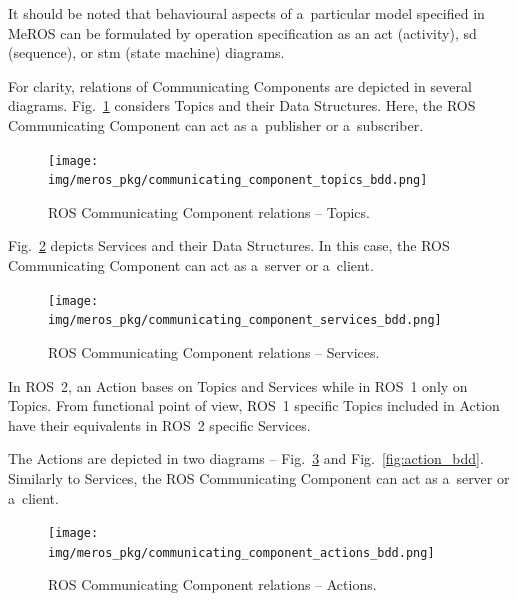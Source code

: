 \documentclass[11pt,oneside,a4paper]{report}
\begin{document}
	It should be noted that behavioural aspects of a~particular model specified in MeROS can be formulated by operation specification as an act (activity), sd (sequence), or stm (state machine) diagrams. 
	
	
	For clarity, relations of Communicating Components are depicted in several diagrams. Fig.~\ref{fig:communicating_component_topics_bdd} considers Topics and their Data Structures. Here, the ROS Communicating Component can act as a~publisher or a~subscriber.	
	 
	
	\begin{figure}[H]
		\centering
		\begin{center}
			{\texttt{[image: img/meros\_pkg/communicating\_component\_topics\_bdd.png]}}
		\end{center}
		\caption{ROS Communicating Component relations -- Topics.} 
		\label{fig:communicating_component_topics_bdd}
	\end{figure}
	
	\pagebreak
	
	Fig.~\ref{fig:communication_blocks_services_bdd} depicts Services and their Data Structures. In this case, the ROS Communicating Component can act as a~server or a~client.	
	
		
	\begin{figure}[H]
		\centering
		\begin{center}
			{\texttt{[image: img/meros\_pkg/communicating\_component\_services\_bdd.png]}}
		\end{center}
		\caption{ROS Communicating Component relations -- Services.} 
		\label{fig:communication_blocks_services_bdd}
	\end{figure}
	
	In ROS~2, an Action bases on Topics and Services while in ROS~1 only on Topics. From functional point of view, ROS~1 specific Topics included in Action have their equivalents in ROS~2 specific Services. 
	
	
	The Actions are depicted in two diagrams -- Fig.~\ref{fig:communicating_component_actions_bdd} and Fig.~\ref{fig:action_bdd}. Similarly to Services, the ROS Communicating Component can act as a~server or a~client.	 
	
	
	\begin{figure}[H]
		\centering
		\begin{center}
			{\texttt{[image: img/meros\_pkg/communicating\_component\_actions\_bdd.png]}}
		\end{center}
		\caption{ROS Communicating Component relations -- Actions.} 
		\label{fig:communicating_component_actions_bdd}
	\end{figure}
	
\end{document}
